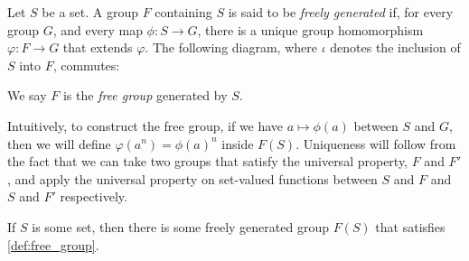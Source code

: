 \begin{definition}\label{def:free_group}
  Let $S$ be a set. A group $F$ containing $S$ is said to be \textit{freely generated} if, for every group $G$, and every map $\phi\colon S\rightarrow G$, there is a unique group homomorphism $\varphi\colon F\rightarrow G$ that extends $\varphi$. The following diagram, where $\iota$ denotes the inclusion of $S$ into $F$, commutes:
    \begin{center}
    \end{center}
  We say $F$ is the \textit{free group} generated by $S$.
\end{definition}
Intuitively, to construct the free group, if we have $a\mapsto \phi(a)$ between $S$ and $G$, then we will define $\varphi\left(a^n\right) = \phi(a)^n$ inside $F(S)$. Uniqueness will follow from the fact that we can take two groups that satisfy the universal property, $F$ and $F'$, and apply the universal property on set-valued functions between $S$ and $F$ and $S$ and $F'$ respectively. 
\begin{theorem}\label{thm:free_group_existence}
  If $S$ is some set, then there is some freely generated group $F(S)$ that satisfies \ref{def:free_group}.
\end{theorem}
